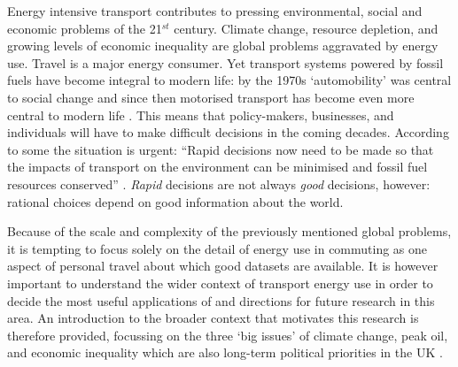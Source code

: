 Energy intensive transport
contributes to pressing environmental, social and economic problems of the
21$^{st}$ century. Climate change, resource depletion, and growing levels of
economic inequality are global problems aggravated by energy use.
Travel is a major energy consumer. Yet transport
systems powered by fossil fuels have become integral to modern life:
by the 1970s `automobility' was central to social change \citep{Illich1974}
and since then motorised transport has become even more central to
modern life \citep{Rodrigue2009}.
This means that policy-makers, businesses, and individuals
 will have to make difficult decisions in the coming decades.
According to some the situation is urgent: ``Rapid decisions now need to
be made
so that the impacts of transport on the environment can be minimised and fossil
fuel resources conserved'' \citep[p.~354]{Chapman2007}. \emph{Rapid} decisions are not
always \emph{good} decisions, however: rational choices depend on good
information about the world. 

Because of the scale and complexity of the previously mentioned global
problems, it is tempting to focus solely on the detail of energy use in commuting
 as one aspect of personal travel about which good datasets are available.
It is however important to understand the wider context of 
transport energy use in order to decide the most useful applications of and
directions for future research in this area.
An introduction to the broader context that motivates this research is therefore
provided, focussing on the three `big issues' of climate change, peak oil,
and economic inequality which are also
long-term political priorities in the UK \citep{UKERC2010}.

